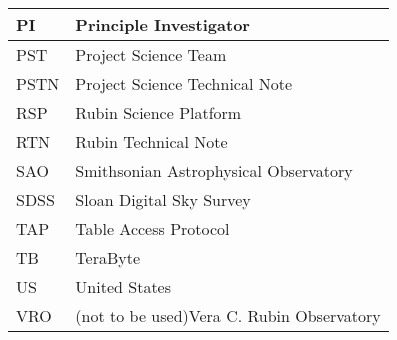 \begin{longtable}{p{}p{}}
PI & Principle Investigator \\\hline
PST & Project Science Team \\\hline
PSTN & Project Science Technical Note \\\hline
RSP & Rubin Science Platform \\\hline
RTN & Rubin Technical Note \\\hline
SAO & Smithsonian Astrophysical Observatory \\\hline
SDSS & Sloan Digital Sky Survey \\\hline
TAP & Table Access Protocol \\\hline
TB & TeraByte \\\hline
US & United States \\\hline
VRO & (not to be used)Vera C. Rubin Observatory \\\hline
\end{longtable}
